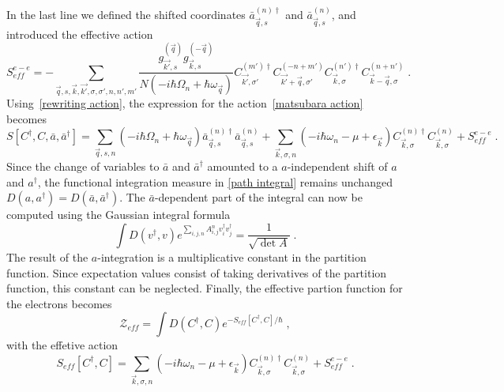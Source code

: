 \documentclass{article}
\begin{document}
In the last line we defined the shifted coordinates  $\bar{a}^{(n)\dagger}_{\vec{q},s}$ and $\bar{a}^{(n)}_{\vec{q},s}$, and introduced the effective action
\begin{equation}
    S^{e-e}_{eff} = -\sum_{\vec{q},s,\vec{k},\vec{k'},\sigma,\sigma', n, n', m'} \frac{g_{\vec{k'},s}^{(\vec{q})} g_{\vec{k},s}^{(-\vec{q})}  }{N\left(-i\hbar\Omega_n + \hbar \omega_{\vec{q}}\right)}
      C^{(m')\dagger}_{\vec{k'},\sigma'}C^{(-n + m')}_{\vec{k'} + \vec{q},\sigma'} C^{(n')\dagger}_{\vec{k},\sigma}C^{(n + n')}_{\vec{k} - \vec{q},\sigma}\;. 
    \label{effective hamiltonian}
\end{equation}
Using~\cref{rewriting action}, the expression for the action~\cref{matsubara action} becomes
\begin{equation}
     S[C^{\dagger},C,\bar{a},\bar{a}^{\dagger}] = \sum_{\vec{q},s,n} \left(-i\hbar\Omega_n + \hbar \omega_{\vec{q}}\right)  \bar{a}^{(n)\dagger}_{\vec{q},s}\bar{a}^{(n)}_{\vec{q},s} + \sum_{\vec{k},\sigma, n} \left(-i\hbar\omega_n - \mu + \epsilon_{\vec{k}}\right) C^{(n)\dagger}_{\vec{k},\sigma} C^{(n)}_{\vec{k},\sigma} +  S^{e-e}_{eff} \;.
     \label{action shifted coordinates}
\end{equation}
Since the change of variables to $\bar{a}$ and $\bar{a}^{\dagger}$ amounted to a $a$-independent shift of $a$ and $a^{\dagger}$, the functional integration measure in \cref{path integral} remains unchanged $D(a,a^{\dagger}) = D(\bar{a},\bar{a}^{\dagger})$. 
The $\bar{a}$-dependent part of the integral can now be computed using the Gaussian integral formula~\cite{Altland}
\begin{equation}
    \int D(v^{\dagger},v) e^{\sum_{i,j,n} A_{i,j}^{n} v_i^{\dagger} v_j^{\dagger}} = \frac{1}{\sqrt{\det{A}}} \;.
    \label{gaussian integral}
\end{equation}
The result of the ${a}$-integration is a multiplicative constant in the partition function. Since expectation values consist of taking derivatives of the partition function, this constant can be neglected. Finally, the effective partion function for the electrons becomes
\begin{equation}
    \mathcal{Z}_{eff} = \int D(C^{\dagger}, C) e^{-S_{eff}[C^{\dagger},C] / \hbar}\;,
    \label{effective partion function}
\end{equation} 
with the effetive action
\begin{equation}
    S_{eff}[C^{\dagger},C] = \sum_{\vec{k},\sigma, n} \left(-i\hbar\omega_n - \mu + \epsilon_{\vec{k}}\right) C^{(n)\dagger}_{\vec{k},\sigma} C^{(n)}_{\vec{k},\sigma} +  S^{e-e}_{eff} \;.
    \label{effective action}
\end{equation}


\printbibliography
\end{document}
